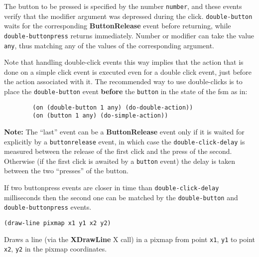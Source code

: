 The button to be pressed is specified by the number \verb"number", and these
events verify that the modifier argument was depressed during the click.
\verb"double-button" waits for the corresponding {\bf ButtonRelease}
event before returning, while \verb"double-buttonpress" returns
immediately.  Number or modifier can take the value \verb"any", thus
matching any of the values of the corresponding argument.  

Note that handling double-click events this way implies that the action that
is done on a simple click event is executed even for a double click event,
just before the action associated with it. The recommended way to use
double-clicks is to place the \verb"double-button" event {\bf before} the
\verb"button" in the state of the fsm as in:

{\exemplefont\begin{verbatim}
        (on (double-button 1 any) (do-double-action))
        (on (button 1 any) (do-simple-action))
\end{verbatim}}

{\bf Note:} The ``last'' event can be a {\bf ButtonRelease} event only if it
is waited for explicitly by a {\GWM} \verb"buttonrelease" event, in which
case the \verb"double-click-delay" is measured between the release of the
first click and the press of the second. Otherwise (if the first click is
awaited by a \verb"button" event) the delay is taken between the two
``presses'' of the button.



If two buttonpress events are closer in time than \verb"double-click-delay"
milliseconds then the second one can be matched by the \verb"double-button"
and \verb"double-buttonpress" events.

        
{\usagefont\begin{verbatim}
(draw-line pixmap x1 y1 x2 y2)
\end{verbatim}}\usageupspace

Draws a line (via the {\bf XDrawLine} X call) in a pixmap from point
\verb"x1", \verb"y1" to point \verb"x2", \verb"y2" in the pixmap
coordinates. 


        
